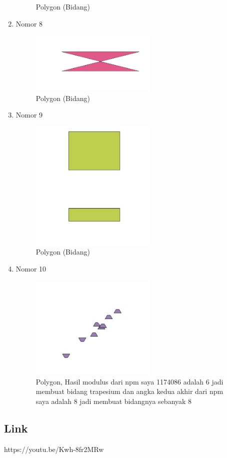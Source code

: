 \begin{enumerate}
\begin{figure}[H]
		\centering
		\caption{Polygon (Bidang)}
	\end{figure}
	\item Nomor 8
	
	\begin{figure}[H]
		\includegraphics[width=6cm]{figures/Tugas2/1174086/No8.jpg}
		\centering
		\caption{Polygon (Bidang)}
	\end{figure}
	\item Nomor 9
	
	\begin{figure}[H]
		\includegraphics[width=6cm]{figures/Tugas2/1174086/No9.jpg}
		\centering
		\caption{Polygon (Bidang)}
	\end{figure}
	\item Nomor 10
	
	\begin{figure}[H]
		\includegraphics[width=6cm]{figures/Tugas2/1174086/No10.jpg}
		\centering
		\caption{Polygon, Hasil modulus dari npm saya 1174086 adalah 6 jadi membuat bidang trapesium dan angka kedua akhir dari npm saya adalah 8 jadi membuat bidangnya sebanyak 8}
	\end{figure}
\end{enumerate}
\subsection{Link}
https://youtu.be/Kwh-8fr2MRw
